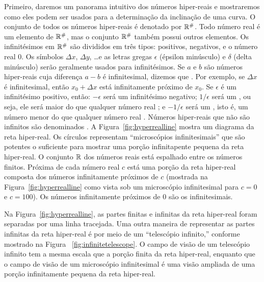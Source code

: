 Primeiro, daremos um panorama intuitivo dos números hiper-reais e
mostraremos como eles podem ser usados para a determinação da
inclinação de uma curva. O conjunto de todos os números hiper-reais
é denotado por ${\mathbb{R}}^\#$. Todo número real é um elemento de ${\mathbb{R}}^\#$,
mas o conjunto ${\mathbb{R}}^\#$ também possui outros elementos. Os infinitésimos
em ${\mathbb{R}}^\#$ são divididos em três tipos: positivos, negativos, e o
número real 0. Os símbolos $\Delta x$, $\Delta y$, \ldots e as letras
gregas $\epsilon$ (épsilon minúsculo) e $\delta$ (delta minúsculo)
serão geralmente usados para infinitésimos. Se $a$ e $b$ são números
hiper-reais cuja diferença $a-b$ é infinitesimal, dizemos que
.
Por exemplo, se $\Delta x$ é infinitesimal, então $x_0 + \Delta x$ está
infinitamente próximo de $x_0$. Se $\epsilon$ é um infinitésimo
positivo, então: $-\epsilon$ será um infinitésimo negativo; $1/\epsilon$
será um ,
ou seja, ele será maior do que qualquer número real%
;
e $-1/\epsilon$ será um , isto é, um número menor do que qualquer número
real%
.
Números hiper-reais que não são infinitos são denominados
. A Figura~\ref{fig:hyperrealline}
mostra um diagrama da reta hiper-real. Os círculos representam
``microscópios infinitesimais'' 
que são potentes o suficiente
para mostrar uma porção infinitapente pequena da reta hiper-real.
O conjunto $\mathbb{R}$ dos números reais está espalhado entre os
números finitos. Próxima de cada número real $c$ está uma
porção da reta hiper-real composta dos números infinitamente próximos
de $c$ (mostrada na Figura~\ref{fig:hyperrealline} como vista sob um
microscópio infinitesimal para $c = 0$ e $c = 100$). Os números
infinitamente próximos de $0$ são os infinitesimais.


Na Figura~\ref{fig:hyperrealline}, as partes finitas e
infinitas da reta hiper-real foram separadas por uma linha tracejada.
Uma outra maneira de representar as partes infinitas da reta
hiper-real é por meio de um ``telescópio infinito,''
 conforme mostrado na Figura~%
\ref{fig:infinitetelescope}. O campo de visão de um telescópio
infinito tem a mesma escala que a porção finita da reta hiper-real,
enquanto que o campo de visão de um microscópio infinitesimal
é uma visão ampliada de uma porção infinitamente pequena da reta
hiper-real.

